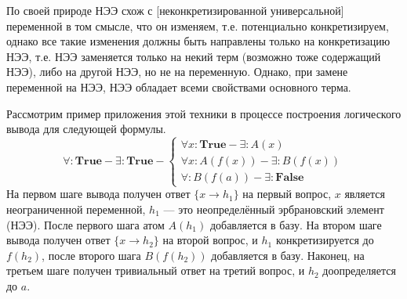 По своей природе НЭЭ схож с [неконкретизированной универсальной] переменной в том смысле, что он изменяем, т.е. потенциально конкретизируем, однако все такие изменения должны быть направлены только на конкретизацию НЭЭ, т.е. НЭЭ заменяется только на некий терм (возможно тоже содержащий НЭЭ), либо на другой НЭЭ, но не на переменную. Однако, при замене переменной на НЭЭ, НЭЭ обладает всеми свойствами основного терма.

Рассмотрим пример приложения этой техники в процессе построения логического вывода для следующей формулы.
\begin{equation}
	\forall\colon\boldsymbol{True} - \exists\colon\boldsymbol{True} -
	\left\lbrace
	\begin{array}{l}
		\forall x\colon\boldsymbol{True} - \exists\colon A(x) \\
		\forall x\colon A(f(x)) - \exists\colon B(f(x)) \\
		\forall\colon B(f(a)) - \exists\colon \boldsymbol{False}
	\end{array}\right.
\end{equation}
На первом шаге вывода получен ответ $\{x \rightarrow h_1\}$ на первый вопрос, $x$ является неограниченной переменной, $h_1$ --- это неопределённый эрбрановский элемент (НЭЭ). После первого шага атом $A(h_1)$ добавляется в базу. На втором шаге вывода получен ответ $\{x \rightarrow h_2\}$ на второй вопрос, и $h_1$ конкретизируется до $f(h_2)$, после второго шага $B(f(h_2))$ добавляется в базу. Наконец, на третьем шаге получен тривиальный ответ на третий вопрос, и $h_2$ доопределяется до $a$.

